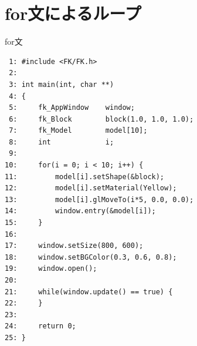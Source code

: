 \section{for文によるループ} \label{sec:02-for}
\begin{itembox}[l]{for文}
\begin{verbatim}
 1: #include <FK/FK.h>
 2: 
 3: int main(int, char **)
 4: {
 5:     fk_AppWindow    window;
 6:     fk_Block        block(1.0, 1.0, 1.0);
 7:     fk_Model        model[10];
 8:     int             i;
 9: 
10:     for(i = 0; i < 10; i++) {
11:         model[i].setShape(&block);
12:         model[i].setMaterial(Yellow);
13:         model[i].glMoveTo(i*5, 0.0, 0.0);
14:         window.entry(&model[i]);
15:     }
16: 
17:     window.setSize(800, 600);
18:     window.setBGColor(0.3, 0.6, 0.8);
19:     window.open();
20: 
21:     while(window.update() == true) {
22:     }
23: 
24:     return 0;
25: }
\end{verbatim}
\end{itembox}
